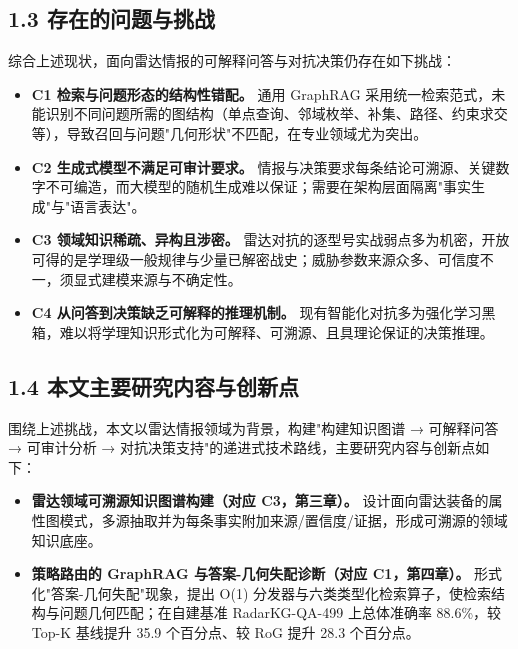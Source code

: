 \documentclass[12pt,a4paper]{ctexart}
\begin{document}
\subsection*{1.3 存在的问题与挑战}

综合上述现状，面向雷达情报的可解释问答与对抗决策仍存在如下挑战：

\begin{itemize}[leftmargin=2em]
\item \textbf{C1 检索与问题形态的结构性错配。} 通用 GraphRAG 采用统一检索范式，未能识别不同问题所需的图结构（单点查询、邻域枚举、补集、路径、约束求交等），导致召回与问题"几何形状"不匹配，在专业领域尤为突出。
\item \textbf{C2 生成式模型不满足可审计要求。} 情报与决策要求每条结论可溯源、关键数字不可编造，而大模型的随机生成难以保证；需要在架构层面隔离"事实生成"与"语言表达"。
\item \textbf{C3 领域知识稀疏、异构且涉密。} 雷达对抗的逐型号实战弱点多为机密，开放可得的是学理级一般规律与少量已解密战史；威胁参数来源众多、可信度不一，须显式建模来源与不确定性。
\item \textbf{C4 从问答到决策缺乏可解释的推理机制。} 现有智能化对抗多为强化学习黑箱，难以将学理知识形式化为可解释、可溯源、且具理论保证的决策推理。
\end{itemize}

\subsection*{1.4 本文主要研究内容与创新点}

围绕上述挑战，本文以雷达情报领域为背景，构建"构建知识图谱 → 可解释问答 → 可审计分析 → 对抗决策支持"的递进式技术路线，主要研究内容与创新点如下：

\begin{itemize}[leftmargin=2em]
\item \textbf{雷达领域可溯源知识图谱构建（对应 C3，第三章）。} 设计面向雷达装备的属性图模式，多源抽取并为每条事实附加来源/置信度/证据，形成可溯源的领域知识底座。
\end{itemize}

\begin{itemize}[leftmargin=2em]
\item \textbf{策略路由的 GraphRAG 与答案-几何失配诊断（对应 C1，第四章）。} 形式化"答案-几何失配"现象，提出 O(1) 分发器与六类类型化检索算子，使检索结构与问题几何匹配；在自建基准 RadarKG-QA-499 上总体准确率 88.6\%，较 Top-K 基线提升 35.9 个百分点、较 RoG 提升 28.3 个百分点。
\end{itemize}
\end{document}

